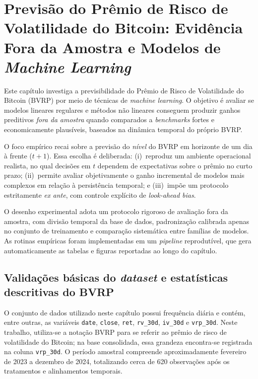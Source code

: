 \chapter{Previsão do Prêmio de Risco de Volatilidade do Bitcoin: Evidência Fora da Amostra e Modelos de \textit{Machine Learning}}
\label{chap:cap6_ml}

Este capítulo investiga a previsibilidade do Prêmio de Risco de Volatilidade do
Bitcoin (BVRP) por meio de técnicas de \textit{machine learning}. O objetivo é
avaliar se modelos lineares regulares e métodos não lineares conseguem produzir
ganhos preditivos \textit{fora da amostra} quando comparados a \textit{benchmarks}
fortes e economicamente plausíveis, baseados na dinâmica temporal do próprio BVRP.

O foco empírico recai sobre a previsão do \textit{nível} do BVRP em horizonte de
um dia à frente ($t+1$). Essa escolha é deliberada: (i)~reproduz um ambiente
operacional realista, no qual decisões em $t$ dependem de expectativas sobre o
prêmio no curto prazo; (ii)~permite avaliar objetivamente o ganho incremental de
modelos mais complexos em relação à persistência temporal; e (iii)~impõe um
protocolo estritamente \textit{ex ante}, com controle explícito de
\textit{look-ahead bias}.

O desenho experimental adota um protocolo rigoroso de avaliação fora da amostra,
com divisão temporal da base de dados, padronização calibrada apenas no conjunto
de treinamento e comparação sistemática entre famílias de modelos. As rotinas
empíricas foram implementadas em um \textit{pipeline} reprodutível, que gera
automaticamente as tabelas e figuras reportadas ao longo do capítulo.

\section{Validações básicas do \textit{dataset} e estatísticas descritivas do BVRP}
\label{sec:cap6_dataset_checks}

O conjunto de dados utilizado neste capítulo possui frequência diária e contém,
entre outras, as variáveis \texttt{date}, \texttt{close}, \texttt{ret},
\texttt{rv\_30d}, \texttt{iv\_30d} e \texttt{vrp\_30d}. Neste trabalho, utiliza-se
a notação BVRP para se referir ao prêmio de risco de volatilidade do Bitcoin; na
base consolidada, essa grandeza encontra-se registrada na coluna \texttt{vrp\_30d}.
O período amostral compreende aproximadamente fevereiro de 2023 a dezembro de 2024,
totalizando cerca de 620 observações após os tratamentos e alinhamentos temporais.

